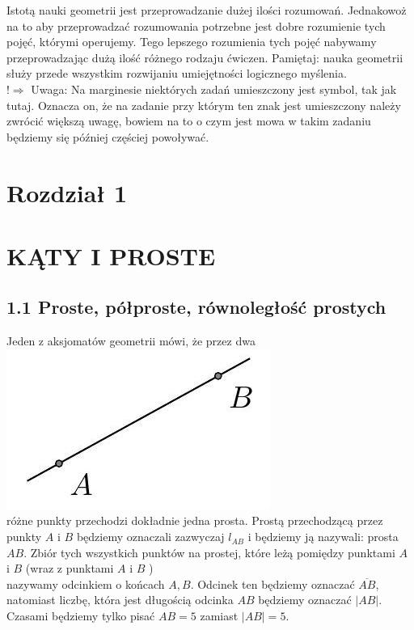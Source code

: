 \documentclass[10pt]{article}
\begin{document}
Istotą nauki geometrii jest przeprowadzanie dużej ilości rozumowań. Jednakowoż na to aby przeprowadzać rozumowania potrzebne jest dobre rozumienie tych pojęć, którymi operujemy. Tego lepszego rozumienia tych pojęć nabywamy przeprowadzając dużą ilość różnego rodzaju ćwiczen. Pamiętaj: nauka geometrii służy przede wszystkim rozwijaniu umiejętności logicznego myślenia.\\
\(!\Rightarrow\) Uwaga: Na marginesie niektórych zadań umieszczony jest symbol, tak jak tutaj. Oznacza on, że na zadanie przy którym ten znak jest umieszczony należy zwrócić większą uwagę, bowiem na to o czym jest mowa w takim zadaniu będziemy się później częściej powoływać.

\section*{Rozdział 1}
\section*{KĄTY I PROSTE}
\subsection*{1.1 Proste, półproste, równoległość prostych}
Jeden z aksjomatów geometrii mówi, że przez dwa\\
\includegraphics[max width=\textwidth, center]{2024_11_21_71f62bd117d375398909g-007}\\
różne punkty przechodzi dokładnie jedna prosta. Prostą przechodzącą przez punkty \(A\) i \(B\) będziemy oznaczali zazwyczaj \(l_{A B}\) i będziemy ją nazywali: prosta \(A B\). Zbiór tych wszystkich punktów na prostej, które leżą pomiędzy punktami \(A\) i \(B\) (wraz z punktami \(A\) i \(B\) )\\
nazywamy odcinkiem o końcach \(A, B\). Odcinek ten będziemy oznaczać \(\overline{A B}\), natomiast liczbę, która jest długością odcinka \(A B\) będziemy oznaczać \(|A B|\). Czasami będziemy tylko pisać \(A B=5\) zamiast \(|A B|=5\).
\end{document}
